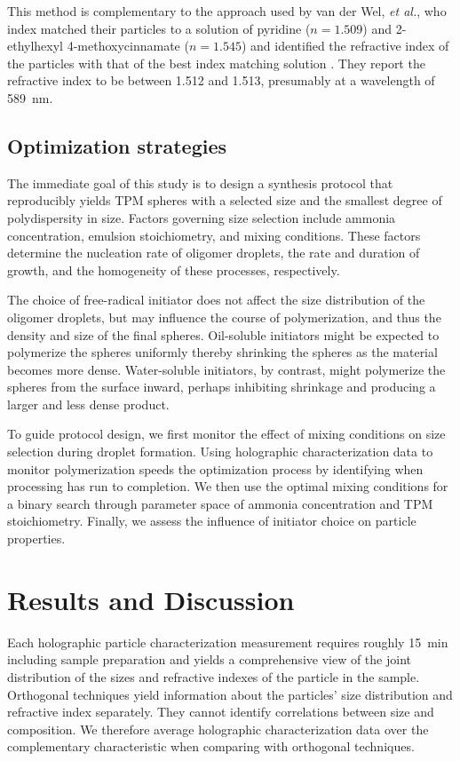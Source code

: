 \documentclass[journal=langd5,manuscript=article]{achemso}
\begin{document}
This method is complementary to the approach used
by van der Wel, \emph{et al.},
who index matched their particles to a solution of
pyridine ($n=1.509$) and \num{2}-ethylhexyl
\num{4}-methoxycinnamate ($n = \num{1.545}$)
and identified the refractive index of the particles
with that of the best index matching solution \cite{vanderwel17}.
They report the refractive index to be between 
\num{1.512} and \num{1.513},
presumably at a wavelength of \SI{589}{\nm}.

\subsection{Optimization strategies}
\label{sec:optimizationstrategies}

The immediate goal of this study is to design
a synthesis protocol that reproducibly 
yields TPM spheres with a selected size and
the smallest degree of polydispersity in size.
Factors governing size selection include
ammonia concentration, emulsion stoichiometry,
and mixing conditions.
These factors determine the nucleation rate of oligomer
droplets, the rate and duration of growth, 
and the homogeneity of these processes, respectively.

The choice of free-radical initiator does not affect
the size distribution of the oligomer droplets, but
may influence the course of polymerization, and thus
the density and size of the final spheres.
Oil-soluble initiators might be expected to
polymerize the spheres uniformly thereby
shrinking the spheres as the material becomes more
dense.
Water-soluble initiators, by contrast, might
polymerize the spheres from the surface inward,
perhaps inhibiting shrinkage and producing a 
larger and less dense product.

To guide protocol design, we first monitor
the effect of mixing conditions on size selection
during droplet formation.
Using holographic characterization data to 
monitor polymerization speeds the optimization process
by identifying when processing has run to completion.
We then use the optimal mixing conditions for
a binary search through parameter space of
ammonia concentration and TPM stoichiometry.
Finally, we assess the influence of initiator
choice on particle properties.

\section{Results and Discussion}
\label{sec:results}

Each holographic particle characterization
measurement
requires roughly \SI{15}{\minute} including
sample preparation and yields 
a comprehensive view of the joint
distribution of the sizes and refractive
indexes of the particle in the sample.
Orthogonal techniques yield information
about the particles' size distribution and
refractive index separately.
They cannot identify correlations between
size and composition.
We therefore average holographic characterization
data over the complementary characteristic when
comparing with orthogonal techniques.
\end{document}
